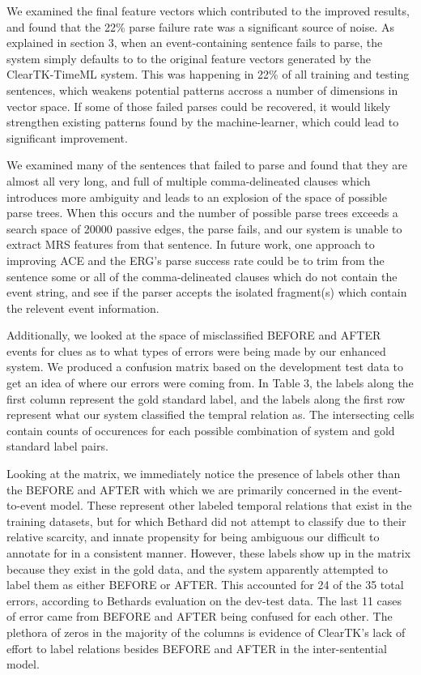 \documentclass[11pt]{article}
\begin{document}
 We examined the final feature vectors which contributed to the improved results, and found that the 22\% parse failure rate was a significant source of noise. As explained in section 3, when an event-containing sentence fails to parse, the system simply defaults to to the original feature vectors generated by the ClearTK-TimeML system. This was happening in 22\% of all training and testing sentences, which weakens potential patterns accross a number of dimensions in vector space. If some of those failed parses could be recovered, it would likely strengthen existing patterns found by the machine-learner, which could lead to significant improvement. 
 
 We examined many of the sentences that failed to parse and found that they are almost all very long, and full of multiple comma-delineated clauses which introduces more ambiguity and leads to an explosion of the space of possible parse trees. When this occurs and the number of possible parse trees exceeds a search space of 20000 passive edges, the parse fails, and our system is unable to extract MRS features from that sentence. In future work, one approach to improving ACE and the ERG's parse success rate could be to trim from the sentence some or all of the comma-delineated clauses which do not contain the event string, and see if the parser accepts the isolated fragment(s) which contain the relevent event information.
 
 Additionally, we looked at the space of misclassified BEFORE and AFTER events for clues as to what types of errors were being made by our enhanced system. We produced a confusion matrix based on the development test data to get an idea of where our errors were coming from. In Table 3, the labels along the first column represent the gold standard label, and the labels along the first row represent what our system classified the tempral relation as. The intersecting cells contain counts of occurences for each possible combination of system and gold standard label pairs.
 
 Looking at the matrix, we immediately notice the presence of labels other than the BEFORE and AFTER with which we are primarily concerned in the event-to-event model. These represent other labeled temporal relations that exist in the training datasets, but for which Bethard did not attempt to classify due to their relative scarcity, and innate propensity for being ambiguous our difficult to annotate for in a consistent manner. However, these labels show up in the matrix because they exist in the gold data, and the system apparently attempted to label them as either BEFORE or AFTER. This accounted for 24 of the 35 total errors, according to Bethards evaluation on the dev-test data. The last 11 cases of error came from BEFORE and AFTER being confused for each other. The plethora of zeros in the majority of the columns is evidence of ClearTK's lack of effort to label relations besides BEFORE and AFTER in the inter-sentential model.
 
\end{document}
